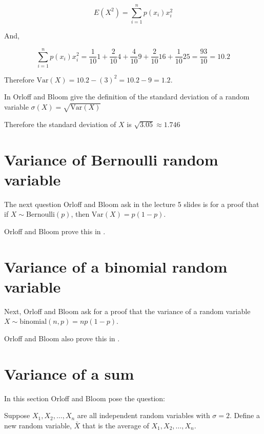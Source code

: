 \documentclass[a4paper,11pt]{article}
\begin{document}
\begin{equation}
    E\left(X^{2} \right) =
      \sum_{i=1}^{n} p\left( x_{i} \right) x_i^{2}
\end{equation}

And,

\begin{equation}
    \sum_{i=1}^{n} p\left( x_{i} \right) x_i^{2}
    = \frac{1}{10} 1 + \frac{2}{10} 4 + \frac{4}{10} 9 + \frac{2}{10} 16 +
    \frac{1}{10} 25 = \frac{93}{10} = 10.2
\end{equation}

Therefore $\text{Var}\left( X \right) = 10.2 - \left( 3 \right)^{2}
  = 10.2 - 9 = 1.2$.

In \cite{reading5a} Orloff and Bloom give the definition of the standard
deviation of a random variable
$\sigma \left( X \right) = \sqrt{\text{Var}\left(X \right)}$

Therefore the standard deviation of $X$ is $\sqrt{3.05} \approx 1.746 $

\section{Variance of Bernoulli random variable}

The next question Orloff and Bloom ask in the lecture 5 slides is for a proof
that if $X \sim \text{Bernoulli} \left( p \right)$, then
$\text{Var}\left( X \right) = p\left( 1-p \right)$.

Orloff and Bloom prove this in \cite{reading5a}.

\section{Variance of a binomial random variable}

Next, Orloff and Bloom ask for a proof that the variance of a random variable
$X \sim \text{binomial}\left(n, p \right) = np \left( 1 - p \right)$.

Orloff and Bloom also prove this in \cite{reading5a}.

\section{Variance of a sum}

In this section Orloff and Bloom pose the question:

Suppose $X_{1}, X_{2}, \ldots, X_{n}$ are all independent random variables
with $\sigma = 2$.  Define a new random variable, $\bar{X}$ that is the average
of $X_{1}, X_{2}, \ldots, X_{n}$.
\end{document}

